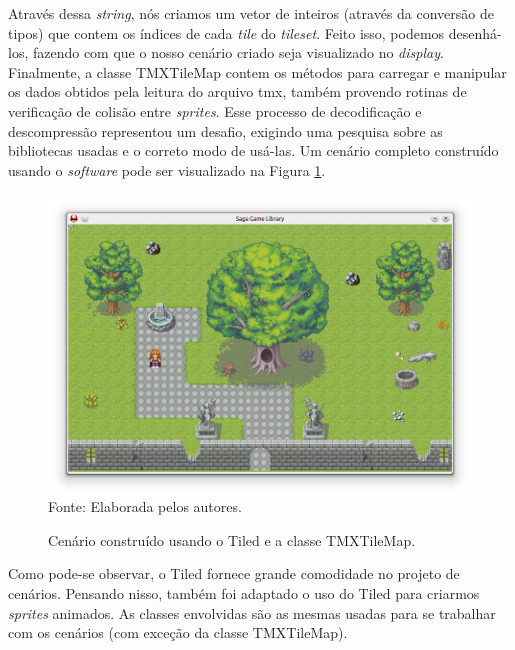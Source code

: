 Através dessa \textit{string}, nós criamos um vetor de inteiros (através da conversão de tipos) que contem os índices de cada \textit{tile} do \textit{tileset}. Feito isso, podemos desenhá-los, fazendo com que o nosso cenário criado seja visualizado no \textit{display}. Finalmente, a classe TMXTileMap contem os métodos para carregar e manipular os dados obtidos pela leitura do arquivo tmx, também provendo rotinas de verificação de colisão entre \textit{sprites}. Esse processo de decodificação e descompressão representou um desafio, exigindo uma pesquisa sobre as bibliotecas usadas e o correto modo de usá-las. Um cenário completo construído usando o \textit{software} pode ser visualizado na Figura \ref{snapshot1}.
%
%
\begin{figure}[ht]
    \centering
    \caption{Cenário construído usando o Tiled e a classe TMXTileMap.}
    \label{snapshot1}
    \includegraphics[scale = 0.60]{Imagens/snapshot1.png}
    \\Fonte: Elaborada pelos autores.
\end{figure}
%
\par 
Como pode-se observar, o Tiled fornece grande comodidade no projeto de cenários. Pensando nisso, também foi adaptado o uso do Tiled para criarmos \textit{sprites} animados. As classes envolvidas são as mesmas usadas para se trabalhar com os cenários (com exceção da classe TMXTileMap).
%
%
